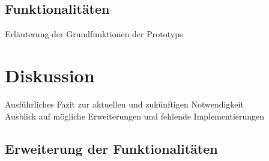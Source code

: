 \documentclass[12pt,a4paper,bibliography=totocnumbered,listof=totocnumbered]{scrartcl}
\begin{document}
\subsection{Funktionalitäten}
Erläuterung der Grundfunktionen der Prototyps

\pagebreak

\section{Diskussion}
Ausführliches Fazit zur aktuellen und zukünftigen Notwendigkeit\\
Ausblick auf mögliche Erweiterungen und fehlende Implementierungen

\subsection{Erweiterung der Funktionalitäten}
\end{document}

